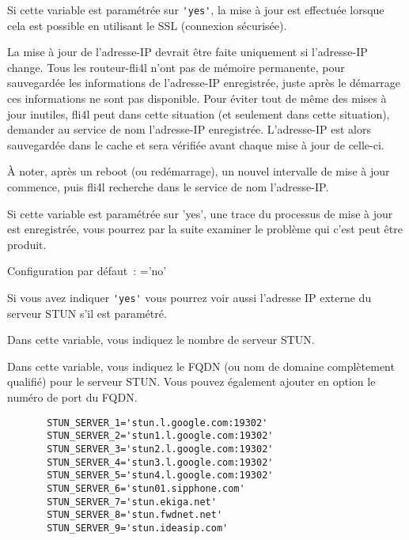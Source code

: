 \begin{description}

    Si cette variable est paramétrée sur \verb*?'yes'?, la mise à jour est
    effectuée lorsque cela est possible en utilisant le SSL (connexion sécurisée).


    La mise à jour de l'adresse-IP devrait être faite uniquement si l'adresse-IP
    change. Tous les routeur-fli4l n'ont pas de mémoire permanente, pour sauvegardée
    les informations de l’adresse-IP enregistrée, juste après le démarrage ces
    informations ne sont pas disponible. Pour éviter tout de même des mises à jour
    inutiles, fli4l peut dans cette situation (et seulement dans cette situation),
    demander au service de nom l'adresse-IP enregistrée. L'adresse-IP est
    alors sauvegardée dans le cache et sera vérifiée avant chaque mise à jour
    de celle-ci.

    À noter, après un reboot (ou redémarrage), un nouvel intervalle de mise à
    jour commence, puis fli4l recherche dans le service de nom l’adresse-IP.


    Si cette variable est paramétrée sur 'yes', une trace du processus de mise
    à jour est enregistrée, vous pourrez par la suite examiner le problème qui
    c'est peut être produit.

    Configuration par défaut~: ='no'

	Si vous avez indiquer \verb*?'yes'? vous pourrez voir aussi l'adresse IP externe
	du serveur STUN s'il est paramétré.


	Dans cette variable, vous indiquez le nombre de serveur STUN.


	Dans cette variable, vous indiquez le FQDN (ou nom de domaine complètement qualifié)
	pour le serveur STUN. Vous pouvez également ajouter en option le numéro de port du FQDN.

\begin{example}
\begin{verbatim}
       STUN_SERVER_1='stun.l.google.com:19302'
       STUN_SERVER_2='stun1.l.google.com:19302'
       STUN_SERVER_3='stun2.l.google.com:19302'
       STUN_SERVER_4='stun3.l.google.com:19302'
       STUN_SERVER_5='stun4.l.google.com:19302'
       STUN_SERVER_6='stun01.sipphone.com'
       STUN_SERVER_7='stun.ekiga.net'
       STUN_SERVER_8='stun.fwdnet.net'
       STUN_SERVER_9='stun.ideasip.com'
\end{verbatim}
\end{example}
\end{description}

